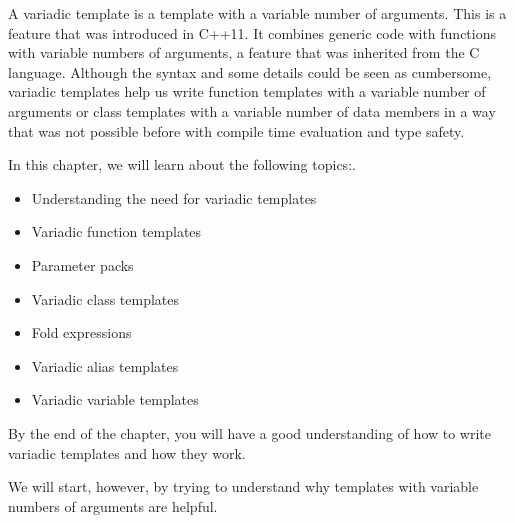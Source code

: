 A variadic template is a template with a variable number of arguments. This is a feature that was introduced in C++11. It combines generic code with functions with variable numbers of arguments, a feature that was inherited from the C language. Although the syntax and some details could be seen as cumbersome, variadic templates help us write function templates with a variable number of arguments or class templates with a variable number of data members in a way that was not possible before with compile time evaluation and type safety.

In this chapter, we will learn about the following topics:.

\begin{itemize}
\item
Understanding the need for variadic templates

\item
Variadic function templates

\item
Parameter packs

\item
Variadic class templates

\item
Fold expressions

\item
Variadic alias templates

\item
Variadic variable templates
\end{itemize}

By the end of the chapter, you will have a good understanding of how to write variadic templates and how they work.

We will start, however, by trying to understand why templates with variable numbers of arguments are helpful.
































